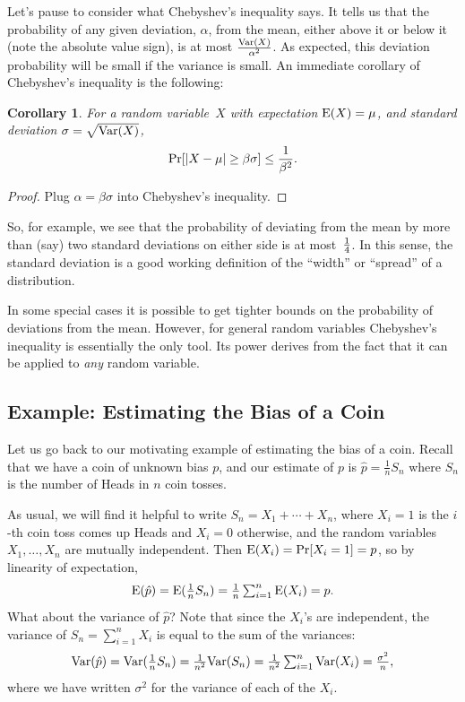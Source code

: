 \documentclass[11pt]{article}
\def\Ex#1{{\rm E}(#1)}
\def\Var#1{{\rm Var}(#1)}
\newcounter{thm}
\newtheorem{corollary}{Corollary}[thm]
\begin{document}
Let's pause to consider what Chebyshev's inequality says.
It tells us that the probability of any given deviation,
$\alpha$, from the mean, either above it or below it (note the
absolute value sign), is at most ${{\Var{X}}\over{\alpha^2}}$.
As expected, this deviation probability will be small if the
variance is small.  An immediate corollary of Chebyshev's
inequality is the following:

\begin{corollary} For a random variable~$X$
with expectation $\Ex{X}=\mu$, and standard deviation
$\sigma=\sqrt{\Var{X}}$, $$
   \Pr[|X-\mu|\ge\beta\sigma] \le {1\over{\beta^2}}.  $$
\end{corollary}

\begin{proof} Plug $\alpha=\beta\sigma$ into Chebyshev's inequality.
\end{proof}

So, for example, we see that the probability of deviating from
the mean by more than (say) two standard deviations on either side
is at most~$1\over 4$.  In this sense, the standard deviation is
a good working definition of the ``width'' or ``spread'' of a distribution.

In some special cases it is 
possible to get tighter bounds on the probability of deviations from
the mean.  However, for general random variables Chebyshev's inequality
is essentially the only tool.  Its power derives from the fact that it can be
applied to {\it any\/} random variable. 



\subsection*{Example: Estimating the Bias of a Coin}

Let us go back to our motivating example of estimating the bias of a coin.
Recall that we have a coin of unknown bias $p$, and our estimate of $p$
is $\hat p = \frac{1}{n} S_n$ where $S_n$ is the number of Heads
in $n$ coin tosses.

As usual, we will find it helpful to write $S_n = X_1 + \cdots + X_n$,
where $X_i = 1$ is the $i$-th coin toss comes up Heads and $X_i = 0$
otherwise, and the random variables $X_1,\dots,X_n$ are mutually independent.
Then $\Ex{X_i} = \Pr[X_i = 1] = p$, so by linearity of expectation,
$$\Ex{\hat p} = \Ex{\textstyle{\frac{1}{n}} S_n} = \textstyle{\frac{1}{n}} \sum_{i=1}^n \Ex{X_i} = p.$$
What about the variance of $\hat p$? Note that
since the $X_i$'s are independent, the variance of $S_n = \sum_{i=1}^n X_i$ is equal to
the sum of the variances:
$$\Var{\hat p} = \Var{{\textstyle{\frac{1}{n}}} S_n} = \textstyle{\frac{1}{n^2}} \Var{S_n}
= \textstyle{\frac{1}{n^2}} \sum_{i=1}^n \Var{X_i} = \frac{\sigma^2}{n},$$
where we have written $\sigma^2$ for the variance of each of the $X_i$.
\end{document}
